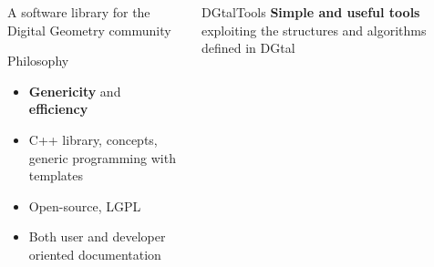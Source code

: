 \documentclass[noamsthm, pdftex, french]{beamer}
\begin{document}
\begin{frame}
\begin{columns}
\begin{alertblock}{\centering A software library for the Digital Geometry community}
      \begin{block}{Philosophy}
        
        \begin{itemize}
        \item {\bf \color{DGtaldarkred} Genericity} and {\bf \color{DGtaldarkred} efficiency}
        \item C++ library, concepts, generic programming with templates   
        \item Open-source, LGPL
        \item Both user and developer oriented documentation
        \end{itemize}
        
      \end{block}
      
      
      
    \end{alertblock}

    
    \begin{alertblock}{\centering DGtalTools}
      {\bf \color{DGtaldarkred} Simple and useful tools} exploiting the structures and algorithms defined in DGtal


\end{alertblock}
\end{columns}
\end{frame}
\end{document}
